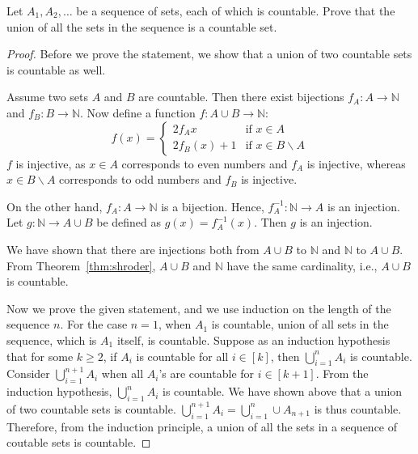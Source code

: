 \documentclass[../main.tex]{subfiles}
\begin{document}
\begin{exercise}
    Let $A_1, A_2, \dots$ be a sequence of sets, each of which is countable.
    Prove that the union of all the sets in the sequence is a countable set.
\end{exercise}
\begin{proof}
    Before we prove the statement, we show that a union of two countable sets is countable as well.

    Assume two sets $A$ and $B$ are countable.
    Then there exist bijections $f_A: A \rightarrow \mathbb N$ and $f_B: B \rightarrow \mathbb N$.
    Now define a function $f: A \cup B \rightarrow \mathbb N$:
    \[
        f(x) = \begin{cases}
            2f_A{x} &\text{if } x \in A\\
            2f_B(x) + 1 &\text{if } x \in B \backslash A
        \end{cases}
    \]
    $f$ is injective, as $x \in A$ corresponds to even numbers and $f_A$ is injective, whereas $x \in B \backslash A$ corresponds to odd numbers and $f_B$ is injective.

    On the other hand, $f_A: A \rightarrow \mathbb N$ is a bijection.
    Hence, $f_A^{-1}: \mathbb{N} \rightarrow A$ is an injection.
    Let $g: \mathbb{N} \rightarrow A \cup B$ be defined as $g(x) = f_A^{-1}(x)$.
    Then $g$ is an injection.

    We have shown that there are injections both from $A \cup B$ to $\mathbb N$ and $\mathbb N$ to $A \cup B$.
    From Theorem~\ref{thm:shroder}, $A \cup B$ and $\mathbb N$ have the same cardinality, i.e., $A \cup B$ is countable.

    Now we prove the given statement, and we use induction on the length of the sequence $n$.
    For the case $n = 1$, when $A_1$ is countable, union of all sets in the sequence, which is $A_1$ itself, is countable.
    Suppose as an induction hypothesis that for some $k \geq 2$, if $A_i$ is countable for all $i \in [k]$, then $\bigcup_{i=1}^n A_i$ is countable.
    Consider $\bigcup_{i=1}^{n+1} A_i$ when all $A_i$'s are countable for $i \in [k+1]$.
    From the induction hypothesis, $\bigcup_{i=1}^n A_i$ is countable.
    We have shown above that a union of two countable sets is countable.
    $\bigcup_{i=1}^{n+1} A_i = \bigcup_{i=1}^n \cup A_{n+1}$ is thus countable.
    Therefore, from the induction principle, a union of all the sets in a sequence of coutable sets is countable.
\end{proof}
\end{document}
